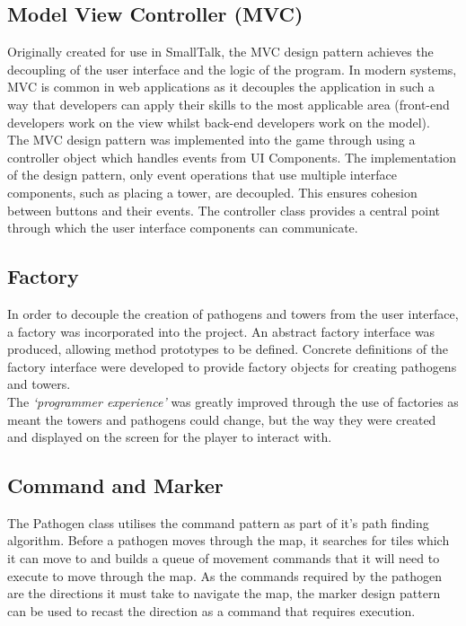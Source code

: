 \documentclass[a4paper,12pt]{article}
\begin{document}
\subsection*{Model View Controller (MVC)}
Originally created for use in SmallTalk, the MVC design pattern achieves the decoupling of the user interface and the logic of the program. In modern systems, MVC is common in web applications as it decouples the application in such a way that developers can apply their skills to the most applicable area (front-end developers work on the view whilst back-end developers work on the model). 
\\
The MVC design pattern was implemented into the game through using a controller object which handles events from UI Components. The implementation of the design pattern, only event operations that use multiple interface components, such as placing a tower, are decoupled. This ensures cohesion between buttons and their events. The controller class provides a central point through which the user interface components can communicate.

\subsection*{Factory}
In order to decouple the creation of pathogens and towers from the user interface, a factory was incorporated into the project. An abstract factory interface was produced, allowing method prototypes to be defined. Concrete definitions of the factory interface were developed to provide factory objects for creating pathogens and towers. 
\\
The \textit{`programmer experience'} was greatly improved through the use of factories as meant the towers and pathogens could change, but the way they were created and displayed on the screen for the player to interact with.

\subsection*{Command and Marker}
The Pathogen class utilises the command pattern as part of it's path finding algorithm. Before a pathogen moves through the map, it searches for tiles which it can move to and builds a queue of movement commands that it will need to execute to move through the map. As the commands required by the pathogen are the directions it must take to navigate the map, the marker design pattern can be used to recast the direction as a command that requires execution. 
\end{document}
